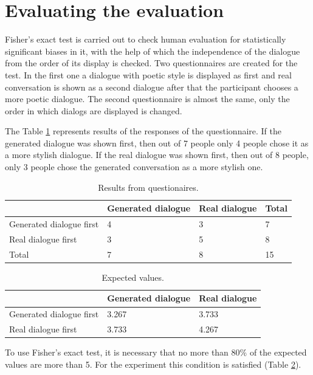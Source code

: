 \section{Evaluating the evaluation}
Fisher's exact test is carried out to check human evaluation for statistically significant biases in it, with the help of which the independence of the dialogue from the order of its display is checked. Two questionnaires are created for the test. In the first one a dialogue with poetic style is displayed as first and real conversation is shown as a second dialogue after that the participant chooses a more poetic dialogue. The second questionnaire is almost the same, only the order in which dialogs are displayed is changed.

The Table \ref{tab:fisher} represents results of the responses of the questionnaire. If the generated dialogue was shown first, then out of 7 people only 4 people chose it as a more stylish dialogue. If the real dialogue was shown first, then out of 8 people, only 3 people chose the generated conversation as a more stylish one.


\begin{table}[ht]
\centering
 \begin{tabular}{|p{4cm}|p{4cm}|p{3cm}|p{2cm}|} 
 \hline
  & Generated dialogue & Real dialogue & Total\\
 \hline
  Generated dialogue first & 4 & 3 & 7 \\
 \hline
  Real dialogue first & 3 & 5 & 8 \\
 \hline
  Total & 7 & 8 & 15\\
 \hline
 \end{tabular}
 \caption{Results from questionaires.}
\label{tab:fisher}
\end{table}

\begin{table}[ht]
\centering
 \begin{tabular}{|p{4cm}|p{4cm}|p{3cm}|} 
 \hline
  & Generated dialogue & Real dialogue \\
 \hline
  Generated dialogue first & 3.267 & 3.733 \\
 \hline
  Real dialogue first & 3.733 & 4.267 \\
 \hline
 \end{tabular}
 \caption{Expected values.}
\label{tab:expected_vals}
\end{table}

To use Fisher's exact test, it is necessary that no more than 80\% of the expected values are more than 5. For the experiment this condition is satisfied (Table \ref{tab:expected_vals}).

